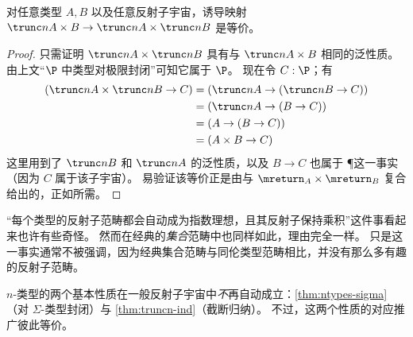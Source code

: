 \begin{cor}\label{cor:trunc_prod}
  对任意类型 $A,B$ 以及任意反射子宇宙，诱导映射 $\reflect(A\times B) \to \reflect(A) \times \reflect(B)$ 是等价。
\end{cor}
\begin{proof}
  只需证明 $\reflect(A) \times \reflect(B)$ 具有与 $\reflect(A\times B)$ 相同的泛性质。
  由上文“$\P$ 中类型对极限封闭”可知它属于 $\P$。
  现在令 $C:\P$；有
  \begin{align*}
    (\reflect(A) \times \reflect(B) \to C)
    &= (\reflect(A) \to (\reflect(B) \to C))\\
    &= (\reflect(A) \to (B \to C))\\
    &= (A \to (B \to C))\\
    &= (A \times B \to C)
  \end{align*}
  这里用到了 $\reflect(B)$ 和 $\reflect(A)$ 的泛性质，以及 $B\to C$ 也属于 \P 这一事实（因为 $C$ 属于该子宇宙）。
  易验证该等价正是由与 $\mreturn_A \times \mreturn_B$ 复合给出的，正如所需。
\end{proof}

“每个类型的反射子范畴都会自动成为指数理想，且其反射子保持乘积”这件事看起来也许有些奇怪。
然而在经典的\emph{集合}范畴中也同样如此，理由完全一样。
只是这一事实通常不被强调，因为经典集合范畴与同伦类型范畴相比，并没有那么多有趣的反射子范畴。

$n$-类型的两个基本性质在一般反射子宇宙中\emph{不}再自动成立：\cref{thm:ntypes-sigma}（对 $\Sigma$-类型封闭）与 \cref{thm:truncn-ind}（截断归纳）。
不过，这两个性质的对应推广彼此等价。



